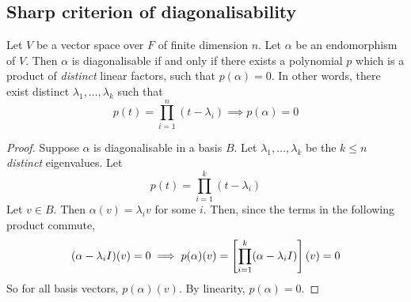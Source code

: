 \subsection{Sharp criterion of diagonalisability}
\begin{theorem}
	Let \( V \) be a vector space over \( F \) of finite dimension \( n \).
	Let \( \alpha \) be an endomorphism of \( V \).
	Then \( \alpha \) is diagonalisable if and only if there exists a polynomial \( p \) which is a product of \textit{distinct} linear factors, such that \( p(\alpha) = 0 \).
	In other words, there exist distinct \( \lambda_1, \dots, \lambda_k \) such that
	\[
		p(t) = \prod_{i=1}^n (t - \lambda_i) \implies p(\alpha) = 0
	\]
\end{theorem}
\begin{proof}
	Suppose \( \alpha \) is diagonalisable in a basis \( B \).
	Let \( \lambda_1, \dots, \lambda_k \) be the \( k \leq n \) \textit{distinct} eigenvalues.
	Let
	\[
		p(t) = \prod_{i=1}^k (t-\lambda_i)
	\]
	Let \( v \in B \).
	Then \( \alpha(v) = \lambda_i v \) for some \( i \).
	Then, since the terms in the following product commute,
	\[
		(\alpha - \lambda_i I)(v) = 0 \implies p(\alpha)(v) = \qty[\prod_{i=1}^k (\alpha - \lambda_i I)](v) = 0
	\]
	So for all basis vectors, \( p(\alpha)(v) \).
	By linearity, \( p(\alpha) = 0 \).


\end{proof}
